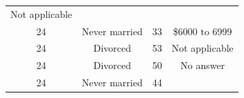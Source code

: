 \documentclass[]{tufte-book}
\begin{document}
\begin{longtable}[]{@{}cccc@{}}
\begin{minipage}[t]{0.21\columnwidth}
Not applicable\strut
\end{minipage}\tabularnewline
\begin{minipage}[t]{0.14\columnwidth}\centering\strut
24\strut
\end{minipage} & \begin{minipage}[t]{0.20\columnwidth}\centering\strut
Never married\strut
\end{minipage} & \begin{minipage}[t]{0.07\columnwidth}\centering\strut
33\strut
\end{minipage} & \begin{minipage}[t]{0.21\columnwidth}\centering\strut
\$6000 to 6999\strut
\end{minipage}\tabularnewline
\begin{minipage}[t]{0.14\columnwidth}\centering\strut
24\strut
\end{minipage} & \begin{minipage}[t]{0.20\columnwidth}\centering\strut
Divorced\strut
\end{minipage} & \begin{minipage}[t]{0.07\columnwidth}\centering\strut
53\strut
\end{minipage} & \begin{minipage}[t]{0.21\columnwidth}\centering\strut
Not applicable\strut
\end{minipage}\tabularnewline
\begin{minipage}[t]{0.14\columnwidth}\centering\strut
24\strut
\end{minipage} & \begin{minipage}[t]{0.20\columnwidth}\centering\strut
Divorced\strut
\end{minipage} & \begin{minipage}[t]{0.07\columnwidth}\centering\strut
50\strut
\end{minipage} & \begin{minipage}[t]{0.21\columnwidth}\centering\strut
No answer\strut
\end{minipage}\tabularnewline
\begin{minipage}[t]{0.14\columnwidth}\centering\strut
24\strut
\end{minipage} & \begin{minipage}[t]{0.20\columnwidth}\centering\strut
Never married\strut
\end{minipage} & \begin{minipage}[t]{0.07\columnwidth}\centering\strut
44\strut
\end{minipage} & \begin{minipage}[t]{0.21\columnwidth}\centering\strut

\end{minipage}
\end{longtable}
\end{document}
